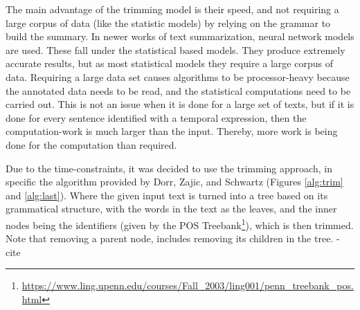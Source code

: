 \par The main advantage of the trimming model is their speed, and not requiring a large corpus of data (like the statistic models) by relying on the grammar to build the summary. In newer works of text summarization, neural network models are used. These fall under the statistical based models. They produce extremely accurate results, but as most statistical models they require a large corpus of data. Requiring a large data set causes algorithms to be processor-heavy because the annotated data needs to be read, and the statistical computations need to be carried out. This is not an issue when it is done for a large set of texts, but if it is done for every sentence identified with a temporal expression, then the computation-work is much larger than the input. Thereby, more work is being done for the computation than required.
\par Due to the time-constraints, it was decided to use the trimming approach, in specific the algorithm provided by Dorr, Zajic, and Schwartz \cite{dorrzajicschwartz2003} (Figures \ref{alg:trim} and \ref{alg:last}). Where the given input text is turned into a tree based on its grammatical structure, with the words in the text as the leaves, and the inner nodes being the identifiers (given by the POS Treebank\footnote{\url{https://www.ling.upenn.edu/courses/Fall_2003/ling001/penn_treebank_pos.html}}), which is then trimmed. Note that removing a parent node, includes removing its children in the tree.
-cite

